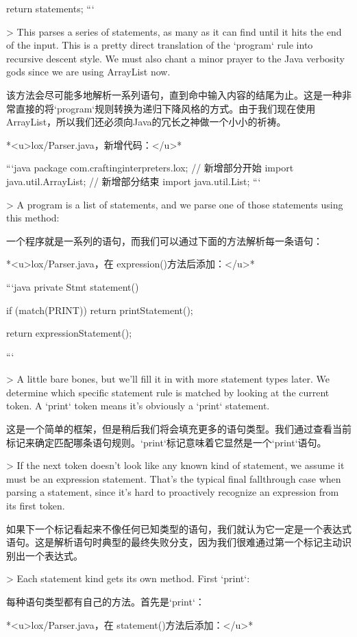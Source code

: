 \documentclass[cn,11pt,chinese]{elegantbook}
\begin{document}
{{{    return statements; 
  }
```

> This parses a series of statements, as many as it can find until it hits the end of the input. This is a pretty direct translation of the `program` rule into recursive descent style. We must also chant a minor prayer to the Java verbosity gods since we are using ArrayList now.

该方法会尽可能多地解析一系列语句，直到命中输入内容的结尾为止。这是一种非常直接的将`program`规则转换为递归下降风格的方式。由于我们现在使用ArrayList，所以我们还必须向Java的冗长之神做一个小小的祈祷。

*<u>lox/Parser.java，新增代码：</u>*

```java
package com.craftinginterpreters.lox;
// 新增部分开始
import java.util.ArrayList;
// 新增部分结束
import java.util.List;
```

> A program is a list of statements, and we parse one of those statements using this method:

一个程序就是一系列的语句，而我们可以通过下面的方法解析每一条语句：

*<u>lox/Parser.java，在 expression()方法后添加：</u>*

```java
  private Stmt statement() {
    if (match(PRINT)) return printStatement();

    return expressionStatement();
  }
```

> A little bare bones, but we’ll fill it in with more statement types later. We determine which specific statement rule is matched by looking at the current token. A `print` token means it’s obviously a `print` statement.

这是一个简单的框架，但是稍后我们将会填充更多的语句类型。我们通过查看当前标记来确定匹配哪条语句规则。`print`标记意味着它显然是一个`print`语句。

> If the next token doesn’t look like any known kind of statement, we assume it must be an expression statement. That’s the typical final fallthrough case when parsing a statement, since it’s hard to proactively recognize an expression from its first token.

如果下一个标记看起来不像任何已知类型的语句，我们就认为它一定是一个表达式语句。这是解析语句时典型的最终失败分支，因为我们很难通过第一个标记主动识别出一个表达式。

> Each statement kind gets its own method. First `print`:

每种语句类型都有自己的方法。首先是`print`：

*<u>lox/Parser.java，在 statement()方法后添加：</u>*

}}
\end{document}

